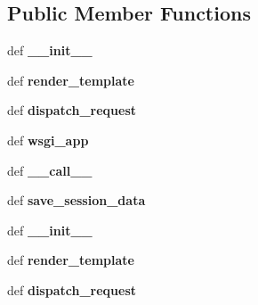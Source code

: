 \subsection*{Public Member Functions}
\begin{DoxyCompactItemize}
\item 
\hypertarget{classwzserver_1_1WzServer_a3650c7152ba300dd9dd6cde4927406df}{def {\bfseries \-\_\-\-\_\-init\-\_\-\-\_\-}}\label{classwzserver_1_1WzServer_a3650c7152ba300dd9dd6cde4927406df}

\item 
\hypertarget{classwzserver_1_1WzServer_a13661c6372da0e23dc61ec61e3187d3a}{def {\bfseries render\-\_\-template}}\label{classwzserver_1_1WzServer_a13661c6372da0e23dc61ec61e3187d3a}

\item 
\hypertarget{classwzserver_1_1WzServer_a42cd1fa0c1034bfc435c63d2dadf1494}{def {\bfseries dispatch\-\_\-request}}\label{classwzserver_1_1WzServer_a42cd1fa0c1034bfc435c63d2dadf1494}

\item 
\hypertarget{classwzserver_1_1WzServer_ad9ace307e3936d8ae3d2b42c23208e8b}{def {\bfseries wsgi\-\_\-app}}\label{classwzserver_1_1WzServer_ad9ace307e3936d8ae3d2b42c23208e8b}

\item 
\hypertarget{classwzserver_1_1WzServer_a7becba76cff1dd16f084d613c9ce2238}{def {\bfseries \-\_\-\-\_\-call\-\_\-\-\_\-}}\label{classwzserver_1_1WzServer_a7becba76cff1dd16f084d613c9ce2238}

\item 
\hypertarget{classwzserver_1_1WzServer_adda0194ac2db4cae016add3d6bebf1be}{def {\bfseries save\-\_\-session\-\_\-data}}\label{classwzserver_1_1WzServer_adda0194ac2db4cae016add3d6bebf1be}

\item 
\hypertarget{classwzserver_1_1WzServer_a3650c7152ba300dd9dd6cde4927406df}{def {\bfseries \-\_\-\-\_\-init\-\_\-\-\_\-}}\label{classwzserver_1_1WzServer_a3650c7152ba300dd9dd6cde4927406df}

\item 
\hypertarget{classwzserver_1_1WzServer_a13661c6372da0e23dc61ec61e3187d3a}{def {\bfseries render\-\_\-template}}\label{classwzserver_1_1WzServer_a13661c6372da0e23dc61ec61e3187d3a}

\item 
\hypertarget{classwzserver_1_1WzServer_a42cd1fa0c1034bfc435c63d2dadf1494}{def {\bfseries dispatch\-\_\-request}}\label{classwzserver_1_1WzServer_a42cd1fa0c1034bfc435c63d2dadf1494}


\end{DoxyCompactItemize}
